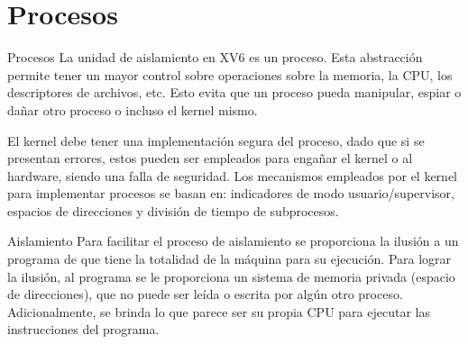 \documentclass{libs/ufc_format}
\begin{document}
\section{Procesos}
\begin{frame}{Procesos}
    La unidad de aislamiento en XV6 es un proceso. Esta abstracción permite tener un mayor control sobre operaciones sobre la memoria, la CPU, los descriptores de archivos, etc. Esto evita que un proceso pueda manipular, espiar o dañar otro proceso o incluso el kernel mismo.

    \vspace{0.3cm}

    El kernel debe tener una implementación segura del proceso, dado que si se presentan errores, estos pueden ser empleados para engañar el kernel o al hardware, siendo una falla de seguridad. Los mecanismos empleados por el kernel para implementar procesos se basan en: indicadores de modo usuario/supervisor, espacios de direcciones y división de tiempo de subprocesos. \cite{xv6_book}
\end{frame}
\begin{frame}{Aislamiento}
    Para facilitar el proceso de aislamiento se proporciona la ilusión a un programa de que tiene la totalidad de la máquina para su ejecución. Para lograr la ilusión, al programa se le proporciona un sistema de memoria privada (espacio de direcciones), que no puede ser leída o escrita por algún otro proceso. Adicionalmente, se brinda lo que parece ser su propia CPU para ejecutar las instrucciones del programa.
\end{frame}
\end{document}
